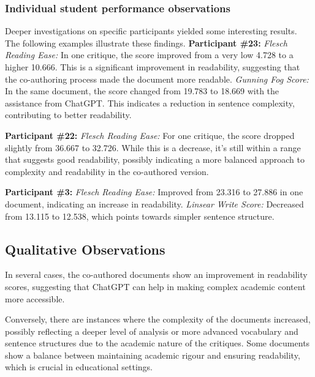 \subsubsection{Individual student performance observations}
\hfill \break
Deeper investigations on specific participants yielded some interesting results.  The following examples illustrate these findings.
\hfill \break
\hfill \break
\textbf{Participant \#23:}
\textit{Flesch Reading Ease:} In one critique, the score improved from a very low 4.728 to a higher 10.666. This is a significant improvement in readability, suggesting that the co-authoring process made the document more readable.
\textit{Gunning Fog Score:} In the same document, the score changed from 19.783 to 18.669 with the assistance from ChatGPT. This indicates a reduction in sentence complexity, contributing to better readability.

\hfill \break
\textbf{Participant \#22:}
\textit{Flesch Reading Ease:} For one critique, the score dropped slightly from 36.667 to 32.726. While this is a decrease, it's still within a range that suggests good readability, possibly indicating a more balanced approach to complexity and readability in the co-authored version.

\hfill \break
\textbf{Participant \#3:}
\textit{Flesch Reading Ease:} Improved from 23.316 to 27.886 in one document, indicating an increase in readability.
\textit{Linsear Write Score:} Decreased from 13.115 to 12.538, which points towards simpler sentence structure.
\hfill \break


\subsection{Qualitative Observations}
In several cases, the co-authored documents show an improvement in readability scores, suggesting that ChatGPT can help in making complex academic content more accessible.

Conversely, there are instances where the complexity of the documents increased, possibly reflecting a deeper level of analysis or more advanced vocabulary and sentence structures due to the academic nature of the critiques. Some documents show a balance between maintaining academic rigour and ensuring readability, which is crucial in educational settings.

